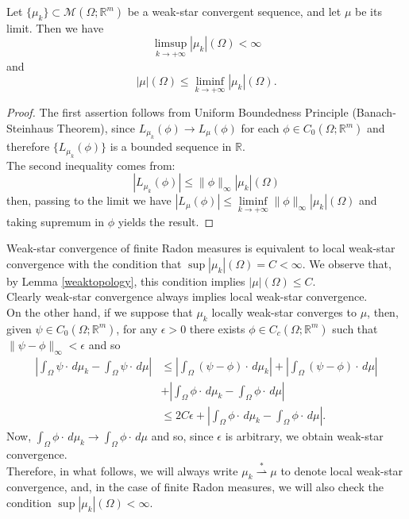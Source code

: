 \begin{lemma} \label{weaktopology} Let $\{ \mu_{k} \} \subset \mathcal{M}(\Omega; \mathbb{R}^{m})$ be a weak-star convergent sequence, and let $\mu$ be its limit. Then we have
\[ \limsup\limits_{k \to +\infty} |\mu_{k}|(\Omega) < \infty \]
and
\[ |\mu|(\Omega) \le \liminf\limits_{k \to +\infty} |\mu_{k}|(\Omega). \]
\end{lemma}
\begin{proof}
The first assertion follows from Uniform Boundedness Principle (Banach-Steinhaus Theorem), since $L_{\mu_{k}}(\phi) \to L_{\mu}(\phi)$ for each $\phi \in C_{0}(\Omega; \mathbb{R}^{m})$ and therefore $\{ L_{\mu_{k}}(\phi) \}$ is a bounded sequence in $\mathbb{R}$. 
\\
The second inequality comes from:
\[ |L_{\mu_{k}}(\phi)| \le \|\phi\|_{\infty} |\mu_{k}|(\Omega) \]
then, passing to the limit we have $|L_{\mu}(\phi)| \le \liminf\limits_{k \to +\infty} \|\phi\|_{\infty} |\mu_{k}|(\Omega)$ and taking supremum in $\phi$ yields the result. 
\end{proof}

\begin{remark} \label{equivalenceweak-star} Weak-star convergence of finite Radon measures is equivalent to local weak-star convergence with the condition that $\sup |\mu_{k}|(\Omega) = C < \infty$. We observe that, by Lemma \ref{weaktopology}, this condition implies $|\mu|(\Omega) \le C$. 
\\
Clearly weak-star convergence always implies local weak-star convergence. 
\\
On the other hand, if we suppose that $\mu_{k}$ locally weak-star converges to $\mu$, then, given $\psi \in C_{0}(\Omega; \mathbb{R}^{m})$, for any $\epsilon > 0$ there exists $\phi \in C_{c}(\Omega; \mathbb{R}^{m})$ such that $\|\psi - \phi\|_{\infty} < \epsilon$ and so
\begin{align*} \left | \int_{\Omega} \psi \cdot \, d\mu_{k} - \int_{\Omega} \psi \cdot \, d\mu \right | & \le \left | \int_{\Omega} (\psi - \phi) \cdot \, d\mu_{k} \right | + \left | \int_{\Omega} (\psi - \phi) \cdot \, d\mu \right | \\
& + \left | \int_{\Omega} \phi \cdot \, d\mu_{k} - \int_{\Omega} \phi \cdot \, d\mu \right | \\
& \le 2 C \epsilon + \left | \int_{\Omega} \phi \cdot \, d\mu_{k} - \int_{\Omega} \phi \cdot \, d\mu \right |.
\end{align*}
Now, $\int_{\Omega} \phi \cdot \, d\mu_{k} \to \int_{\Omega} \phi \cdot \, d\mu$ and so, since $\epsilon$ is arbitrary, we obtain weak-star convergence.
\\
Therefore, in what follows, we will always write $\mu_{k} \stackrel {*}{\rightharpoonup} \mu$ to denote local weak-star convergence, and, in the case of finite Radon measures, we will also check the condition $\sup |\mu_{k}|(\Omega) < \infty$.
\end{remark}

